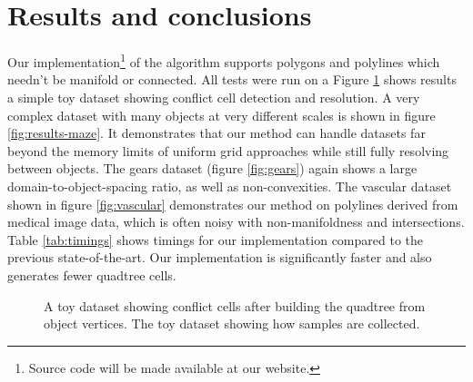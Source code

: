 \documentclass[final,3p,times,twocolumn]{elsarticle}
\begin{document}
\section{Results and conclusions}
Our implementation\footnote{
Source code will be made available at our website. %
}
of the algorithm supports polygons and polylines which needn't be manifold or connected. All tests were run on a  Figure \ref{fig:results-toy} shows results a simple toy dataset showing conflict cell detection and resolution. A very complex dataset with many objects at very different scales is shown in figure \ref{fig:results-maze}. It demonstrates that our method can handle datasets far beyond the memory limits of uniform grid approaches while still fully resolving between objects. The gears dataset (figure \ref{fig:gears}) again shows a large domain-to-object-spacing ratio, as well as non-convexities. The vascular dataset shown in figure \ref{fig:vascular} demonstrates our method on polylines derived from medical image data, which is often noisy with non-manifoldness and intersections. Table \ref{tab:timings} shows timings for our implementation compared to the previous state-of-the-art. Our implementation is significantly faster and also generates fewer quadtree cells.

\begin{figure}
  \centering

  \caption{
    \protect{} A toy dataset showing conflict cells after building the quadtree from object vertices.
    \protect{} The toy dataset showing how samples are collected.
  }
  \label{fig:results-toy}
\end{figure}
\end{document}
